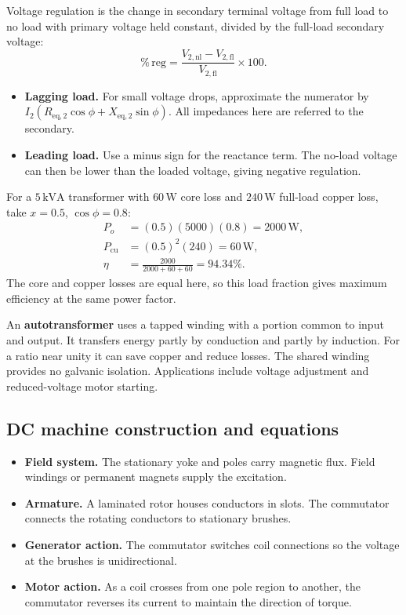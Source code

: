 \documentclass[12pt,a4paper]{article}
\begin{document}
Voltage regulation is the change in secondary terminal voltage from full load to no load with primary voltage held constant, divided by the full-load secondary voltage:
\[
\%\,\mathrm{reg}=\frac{V_{2,\mathrm{nl}}-V_{2,\mathrm{fl}}}{V_{2,\mathrm{fl}}}\times100 .
\]
\begin{itemize}[leftmargin=*, itemsep=3pt, topsep=4pt]
  \item \textbf{Lagging load.} For small voltage drops, approximate the numerator by \(I_2(R_{\mathrm{eq,2}}\cos\phi+X_{\mathrm{eq,2}}\sin\phi)\). All impedances here are referred to the secondary.
  \item \textbf{Leading load.} Use a minus sign for the reactance term. The no-load voltage can then be lower than the loaded voltage, giving negative regulation.
\end{itemize}

\begin{tcolorbox}[examplebox,title={Transformer performance at partial load}]
For a \(5\,\mathrm{kVA}\) transformer with \(60\,\mathrm W\) core loss and \(240\,\mathrm W\) full-load copper loss, take \(x=0.5\), \(\cos\phi=0.8\):
\[
\begin{aligned}
P_o&=(0.5)(5000)(0.8)=2000\,\mathrm W,\\
P_{\mathrm{cu}}&=(0.5)^2(240)=60\,\mathrm W,\\
\eta&=\frac{2000}{2000+60+60}=94.34\%.
\end{aligned}
\]
The core and copper losses are equal here, so this load fraction gives maximum efficiency at the same power factor.
\end{tcolorbox}

An \textbf{autotransformer} uses a tapped winding with a portion common to input and output. It transfers energy partly by conduction and partly by induction. For a ratio near unity it can save copper and reduce losses. The shared winding provides no galvanic isolation. Applications include voltage adjustment and reduced-voltage motor starting.

\subsection{DC machine construction and equations}
\begin{itemize}[leftmargin=*, itemsep=3pt, topsep=4pt]
  \item \textbf{Field system.} The stationary yoke and poles carry magnetic flux. Field windings or permanent magnets supply the excitation.
  \item \textbf{Armature.} A laminated rotor houses conductors in slots. The commutator connects the rotating conductors to stationary brushes.
  \item \textbf{Generator action.} The commutator switches coil connections so the voltage at the brushes is unidirectional.
  \item \textbf{Motor action.} As a coil crosses from one pole region to another, the commutator reverses its current to maintain the direction of torque.
\end{itemize}
\end{document}
